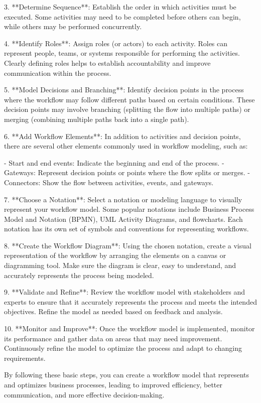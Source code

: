 \documentclass{article}
\begin{document}
3. **Determine Sequence**: Establish the order in which activities must be executed. Some activities may need to be completed before others can begin, while others may be performed concurrently.

4. **Identify Roles**: Assign roles (or actors) to each activity. Roles can represent people, teams, or systems responsible for performing the activities. Clearly defining roles helps to establish accountability and improve communication within the process.

5. **Model Decisions and Branching**: Identify decision points in the process where the workflow may follow different paths based on certain conditions. These decision points may involve branching (splitting the flow into multiple paths) or merging (combining multiple paths back into a single path).

6. **Add Workflow Elements**: In addition to activities and decision points, there are several other elements commonly used in workflow modeling, such as:

   - Start and end events: Indicate the beginning and end of the process.
   - Gateways: Represent decision points or points where the flow splits or merges.
   - Connectors: Show the flow between activities, events, and gateways.

7. **Choose a Notation**: Select a notation or modeling language to visually represent your workflow model. Some popular notations include Business Process Model and Notation (BPMN), UML Activity Diagrams, and flowcharts. Each notation has its own set of symbols and conventions for representing workflows.

8. **Create the Workflow Diagram**: Using the chosen notation, create a visual representation of the workflow by arranging the elements on a canvas or diagramming tool. Make sure the diagram is clear, easy to understand, and accurately represents the process being modeled.

9. **Validate and Refine**: Review the workflow model with stakeholders and experts to ensure that it accurately represents the process and meets the intended objectives. Refine the model as needed based on feedback and analysis.

10. **Monitor and Improve**: Once the workflow model is implemented, monitor its performance and gather data on areas that may need improvement. Continuously refine the model to optimize the process and adapt to changing requirements.

By following these basic steps, you can create a workflow model that represents and optimizes business processes, leading to improved efficiency, better communication, and more effective decision-making.
\end{document}
